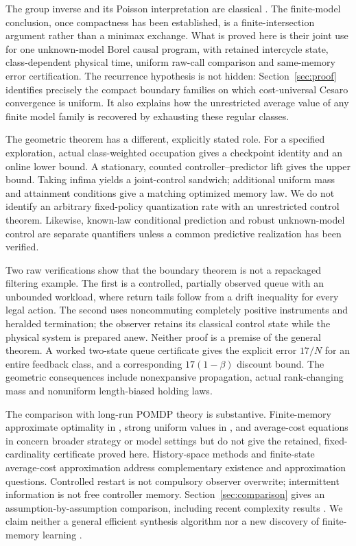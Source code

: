 The group inverse and its Poisson interpretation are classical \cite{Meyer}. The finite-model conclusion, once compactness has been established, is a finite-intersection argument rather than a minimax exchange. What is proved here is their joint use for one unknown-model Borel causal program, with retained intercycle state, class-dependent physical time, uniform raw-call comparison and same-memory error certification. The recurrence hypothesis is not hidden: Section~\ref{sec:proof} identifies precisely the compact boundary families on which cost-universal Cesaro convergence is uniform. It also explains how the unrestricted average value of any finite model family is recovered by exhausting these regular classes.

The geometric theorem has a different, explicitly stated role. For a specified exploration, actual class-weighted occupation gives a checkpoint identity and an online lower bound. A stationary, counted controller--predictor lift gives the upper bound. Taking infima yields a joint-control sandwich; additional uniform mass and attainment conditions give a matching optimized memory law. We do not identify an arbitrary fixed-policy quantization rate with an unrestricted control theorem. Likewise, known-law conditional prediction and robust unknown-model control are separate quantifiers unless a common predictive realization has been verified.

Two raw verifications show that the boundary theorem is not a repackaged filtering example. The first is a controlled, partially observed queue with an unbounded workload, where return tails follow from a drift inequality for every legal action. The second uses noncommuting completely positive instruments and heralded termination; the observer retains its classical control state while the physical system is prepared anew. Neither proof is a premise of the general theorem. A worked two-state queue certificate gives the explicit error $17/N$ for an entire feedback class, and a corresponding $17(1-\beta)$ discount bound. The geometric consequences include nonexpansive propagation, actual rank-changing mass and nonuniform length-biased holding laws.

The comparison with long-run POMDP theory is substantive. Finite-memory approximate optimality in \cite{CSZ}, strong uniform values in \cite{VZ}, and average-cost equations in \cite{Borkar} concern broader strategy or model settings but do not give the retained, fixed-cardinality certificate proved here. History-space methods \cite{Yuksel} and finite-state average-cost approximation \cite{YuBertsekas} address complementary existence and approximation questions. Controlled restart \cite{APZ} is not compulsory observer overwrite; intermittent information \cite{ADK} is not free controller memory. Section~\ref{sec:comparison} gives an assumption-by-assumption comparison, including recent complexity results \cite{ACL}. We claim neither a general efficient synthesis algorithm nor a new discovery of finite-memory learning \cite{HellmanCover}.
